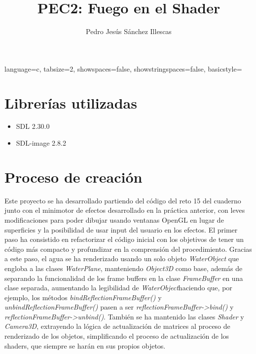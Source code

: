 \documentclass[12pt]{article}%
\begin{document}
\sloppy

\title{PEC2: Fuego en el Shader}
\author{Pedro Jesús Sánchez Illescas}

{
	language=c,
	tabsize=2,
	showspaces=false,
	showstringspaces=false,
	basicstyle=\footnotesize\ttfamily
}


\maketitle

\newpage

\tableofcontents

\newpage

\section{Librerías utilizadas}
\begin{itemize}
	\item SDL 2.30.0
	\item SDL-image 2.8.2
\end{itemize}

\section{Proceso de creación}
	
	Este proyecto se ha desarrollado partiendo del código del reto 15 del cuaderno junto con el minimotor de efectos desarrollado en la práctica anterior, con leves modificaciones para poder dibujar usando ventanas OpenGL en lugar de superficies y la posibilidad de usar input del usuario en los efectos. El primer paso ha consistido en refactorizar el código inicial con los objetivos de tener un código más compacto y profundizar en la comprensión del procedimiento. Gracias a este paso, el agua se ha renderizado usando un solo objeto \textit{WaterObject} que engloba a las clases \textit{WaterPlane}, manteniendo \textit{Object3D} como base, además de separando la funcionalidad de los frame buffers en la clase \textit{FrameBuffer} en una clase separada, aumentando la legibilidad de \textit{WaterObject}haciendo que, por ejemplo, los métodos \textit{bindReflectionFrameBuffer()} y \textit{unbindReflectionFrameBuffer()} pasen a ser \textit{reflectionFrameBuffer->bind()} y \textit{reflectionFrameBuffer->unbind()}. También se ha mantenido las clases \textit{Shader} y \textit{Camera3D}, extrayendo la lógica de actualización de matrices al proceso de renderizado de los objetos, simplificando el proceso de actualización de los shaders, que siempre se harán en sus propios objetos.
	
\end{document}
